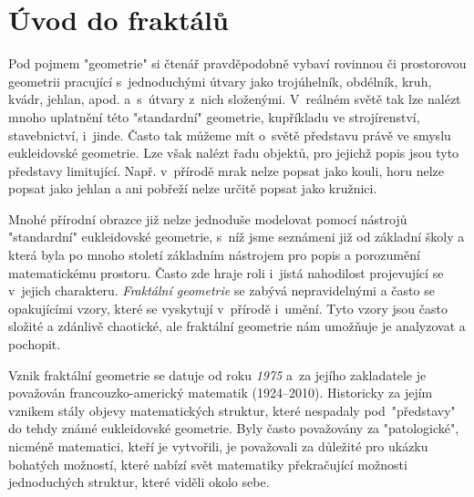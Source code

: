 \chapter{Úvod do fraktálů}\label{chapter:uvod_do_fraktalu}

Pod pojmem "geometrie" si čtenář pravděpodobně vybaví rovinnou či prostorovou geometrii pracující s~jednoduchými útvary jako trojúhelník, obdélník, kruh, kvádr, jehlan, apod. a~s~útvary z~nich složenými. V~reálném světě tak lze nalézt mnoho uplatnění této "standardní" geometrie, kupříkladu ve strojírenství, stavebnictví, i~jinde. Často tak můžeme mít o~světě představu právě ve smyslu eukleidovské geometrie. Lze však nalézt řadu objektů, pro jejichž popis jsou tyto představy limitující. Např. v~přírodě mrak nelze popsat jako kouli, horu nelze popsat jako jehlan a ani pobřeží nelze určitě popsat jako kružnici.\par

Mnohé přírodní obrazce již nelze jednoduše modelovat pomocí nástrojů "standardní" eukleidovské geometrie, s~níž jsme seznámeni již od základní školy a která byla po mnoho století základním nástrojem pro popis a porozumění matematickému prostoru. Často zde hraje roli i~jistá nahodilost projevující se v~jejich charakteru. \emph{Fraktální geometrie} se zabývá nepravidelnými a často se opakujícími vzory, které se vyskytují v~přírodě i~umění. Tyto vzory jsou často složité a zdánlivě chaotické, ale fraktální geometrie nám umožňuje je analyzovat a pochopit.\par

Vznik fraktální geometrie se datuje od roku \emph{1975} a~za jejího zakladatele je považován francouzko-americký matematik  \mbox{(1924--2010)}. Historicky za jejím vznikem stály objevy matematických struktur, které nespadaly pod~"představy" do tehdy známé eukleidovské geometrie. Byly často považovány za "patologické", nicméně matematici, kteří je vytvořili, je považovali za důležité pro ukázku bohatých možností, které nabízí svět matematiky překračující možnosti jednoduchých struktur, které viděli okolo sebe. \citep[str. 33]{Mandelbrot1983}




